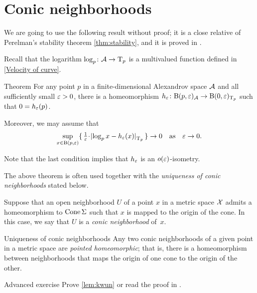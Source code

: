 \section{Conic neighborhoods}

We are going to use the following result without proof;
it is a close relative of Perelman's stability theorem \ref{thm:stability}, and it is proved in \cite{perelman1993}.

Recall that the logarithm $\log_p\colon\mathcal{A}\to \mathrm{T}_p$ is a multivalued function defined in \ref{Velocity of curve}.

\begin{thm}{Theorem}\label{thm:spherical-nbhd}
For any point $p$ in a finite-dimensional Alexandrov space $\mathcal{A}$ and all sufficiently small $\varepsilon>0$,
there is a homeomorphism $h_\varepsilon\colon\mathrm{B}{}(p,\varepsilon)_{\mathcal{A}}\to \mathrm{B}{}(0,\varepsilon)_{\mathrm{T}_p}$ such that $0=h_\varepsilon(p)$.

Moreover, we may assume that
\[
\sup_{x\in \oBall(p,\eps)}\{\,\tfrac1\eps\cdot\dist{\log_px}{h_\eps(x)}{\T_p}\,\}\to 0
\quad\text{as}\quad
\eps\to 0.\]
\end{thm}

Note that the last condition implies that $h_\varepsilon$ is an $o(\varepsilon)$-isometry.

The above theorem is often used together with the \textit{uniqueness of conic neighborhoods} stated below.

Suppose that an open neighborhood $U$ of a point $x$ in a metric space $\mathcal{X}$
admits a homeomorphism to $\mathop{\rm Cone}\nolimits\Sigma$ such that $x$ is mapped to the origin of the cone.
In this case, we say that $U$ is a \emph{conic neighborhood} of~$x$.

\begin{thm}{Uniqueness of conic neighborhoods}\label{lem:kwun}
Any two conic neighborhoods of a given point in a metric space are \emph{pointed homeomorphic}; that is, there is a homeomorphism between neighborhoods that maps the origin of one cone to the origin of the other.
\end{thm}

\begin{thm}{Advanced exercise}\label{ex:conic}
Prove \ref{lem:kwun} or read the proof in \cite{kwun1964}.
\end{thm}


